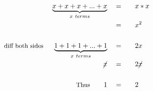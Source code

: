 \begin{alignat*}{5}
&\,&\underbrace{x+x+x+...+x}_{x~terms}\quad&=\quad&&x*x\\
&\,&\,&=&&x^2\\ \\
&\small\text{diff both sides }&\underbrace{1+1+1+...+1}_{x~terms}\quad&=&&2x\\
&\,&\cancel{x}\quad&=&&2\cancel{x}\\ \\
&\,&\small\text{Thus}\normalsize\qquad1\quad&=&&2
\end{alignat*}
